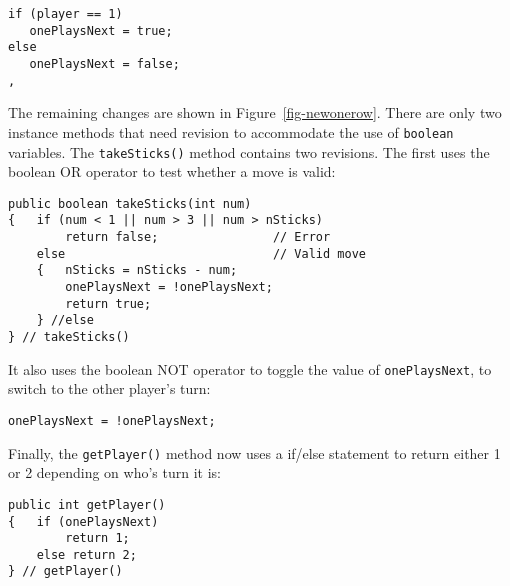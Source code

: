 \begin{jjjlisting}
\begin{lstlisting}
if (player == 1)
   onePlaysNext = true;
else
   onePlaysNext = false;
,\end{lstlisting}
\end{jjjlisting}

\noindent The remaining changes are shown in Figure~\ref{fig-newonerow}.
There are only two instance methods that need revision to accommodate
the use of {\tt boolean} variables. The {\tt takeSticks()} method
contains two revisions. The first uses the boolean OR operator to test
whether a move is valid:

\begin{jjjlisting}
\begin{lstlisting}
public boolean takeSticks(int num)
{   if (num < 1 || num > 3 || num > nSticks) 
        return false;                // Error
    else                             // Valid move
    {   nSticks = nSticks - num;
        onePlaysNext = !onePlaysNext;
        return true;
    } //else
} // takeSticks()
\end{lstlisting}
\end{jjjlisting}

\noindent It also uses the boolean NOT operator to toggle 
the value of {\tt onePlaysNext}, to switch to the other player's turn:

\begin{jjjlisting}
\begin{lstlisting}
onePlaysNext = !onePlaysNext;
\end{lstlisting}
\end{jjjlisting}

\noindent Finally, the {\tt getPlayer()} method now uses a
if/else statement to return either 1 or 2 depending on who's
turn it is:

\begin{jjjlisting}
\begin{lstlisting}
public int getPlayer()
{   if (onePlaysNext) 
        return 1;
    else return 2;
} // getPlayer()
\end{lstlisting}
\end{jjjlisting}


